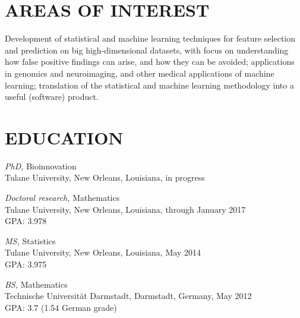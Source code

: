 \documentclass[margin]{res} %
\begin{document}
\begin{resume}




\section{AREAS OF INTEREST}

Development of statistical and machine learning techniques for feature selection and prediction on big high-dimensional datasets, with focus on understanding how false positive findings can arise, and how they can be avoided;
applications in genomics and neuroimaging, and other medical applications of machine learning;
translation of the statistical and machine learning methodology into a useful (software) product.


\section{EDUCATION}

{\sl PhD,} Bioinnovation \\
Tulane University, New Orleans, Louisiana, in progress

{\sl Doctoral research,} Mathematics \\
Tulane University, New Orleans, Louisiana, through January 2017\\
GPA: 3.978

{\sl MS,} Statistics \\
Tulane University, New Orleans, Louisiana, May 2014\\
GPA: 3.975

{\sl BS,} Mathematics\\
Technische Universit\"{a}t Darmstadt, Darmstadt, Germany, May 2012\\
GPA: 3.7 (1.54 German grade)



\end{resume}
\end{document}
